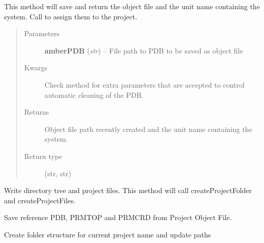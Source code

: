 \documentclass[letterpaper,10pt,english]{sphinxmanual}
\begin{document}
\begin{fulllineitems}
\begin{fulllineitems}
This method will save and return the object file and the unit name containing the system.
Call {\hyperref[project:pyMDMix.Project.Project.setOFF]{}} to assign them to the project.
\begin{quote}\begin{description}
\item[{Parameters}] \leavevmode
\textbf{amberPDB} (\emph{str}) -- File path to PDB to be saved as object file

\item[{Kwargs}] \leavevmode
Check  method for extra parameters that are accepted to control automatic cleaning of the PDB.

\item[{Returns}] \leavevmode
Object file path recently created and the unit name containing the system.

\item[{Return type}] \leavevmode
(str, str)

\end{description}\end{quote}

\end{fulllineitems}


\begin{fulllineitems}
\label{project:pyMDMix.Project.Project.createProject}
Write directory tree and project files. This method will call createProjectFolder and createProjectFiles.

\end{fulllineitems}


\begin{fulllineitems}
\label{project:pyMDMix.Project.Project.createProjectFiles}
Save reference PDB, PRMTOP and PRMCRD from Project Object File.

\end{fulllineitems}


\begin{fulllineitems}
\label{project:pyMDMix.Project.Project.createProjectFolder}
Create folder structure for current project name and update paths


\end{fulllineitems}
\end{fulllineitems}
\end{document}
